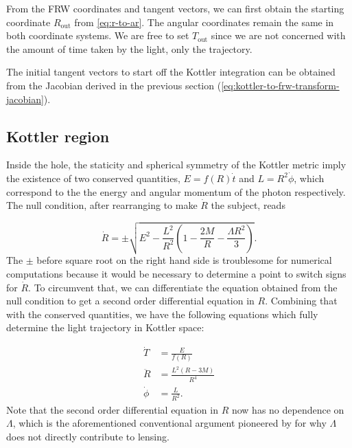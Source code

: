 From the FRW coordinates and tangent vectors, we can first obtain the starting coordinate $R_{\text{out}}$ from \autoref{eq:r-to-ar}. The angular coordinates remain the same in both coordinate systems. We are free to set $T_{\text{out}}$ since we are not concerned with the amount of time taken by the light, only the trajectory. 

The initial tangent vectors to start off the Kottler integration can be obtained from the Jacobian derived in the previous section (\autoref{eq:kottler-to-frw-transform-jacobian}).

\subsection{Kottler region}

Inside the hole, the staticity and spherical symmetry of the Kottler metric imply the existence of two conserved quantities, $E = f(R) \dot{t}$ and $L = R^2 \dot{\phi}$, which correspond to the the energy and angular momentum of the photon respectively. The null condition, after rearranging to make $\dot{R}$ the subject, reads

\begin{equation}
  \dot{R} = \pm \sqrt{E^2 - \frac{L^2}{R^2} \left ( 1 - \frac{2M}{R} - \frac{\Lambda R^2}{3}\right )}.
  \label{eq:kottler-null-condition}
\end{equation}
The $\pm$ before square root on the right hand side is troublesome for numerical computations because it would be necessary to determine a point to switch signs for $\dot{R}$. To circumvent that, we can differentiate the equation obtained from the null condition to get a second order differential equation in $R$. Combining that with the conserved quantities, we have the following equations which fully determine the light trajectory in Kottler space:

\begin{subequations}
  \begin{align}
    \dot{T} &= \frac{E}{f(R)}\\
    \ddot{R}  &= \frac{L^2 (R-3M)}{R^4}\\
    \dot{\phi} &= \frac{L}{R^2}.
  \end{align}
  \label{eq:kottler-null-geodesics}%
\end{subequations}
Note that the second order differential equation in $R$ now has no dependence on $\Lambda$, which is the aforementioned conventional argument pioneered by \citet{islam1983cosmological} for why $\Lambda$ does not directly contribute to lensing. 

